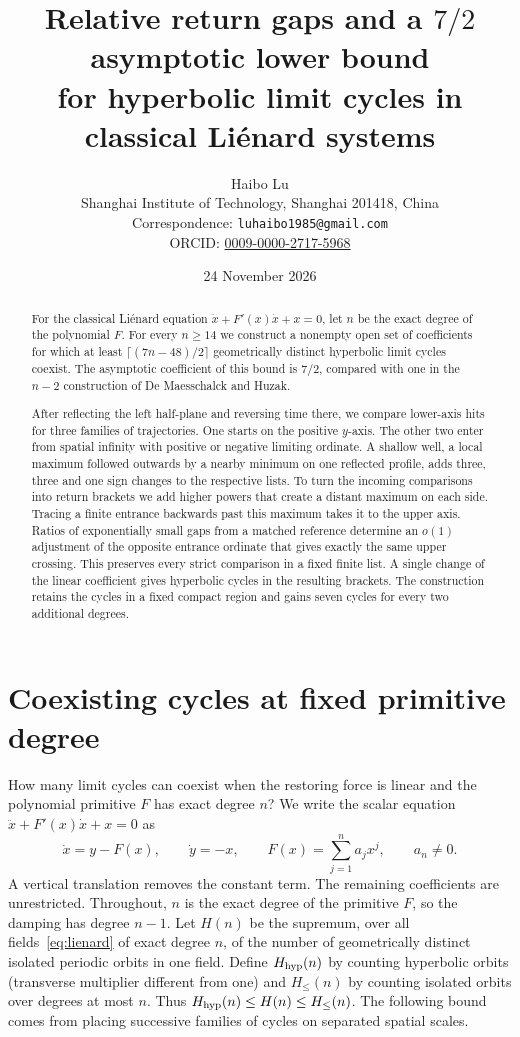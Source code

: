 \documentclass[11pt]{article}
\title{Relative return gaps and a $7/2$ asymptotic lower bound\\ for hyperbolic limit cycles in classical Li\'enard systems}
\author{Haibo Lu\\[2pt]
\small Shanghai Institute of Technology, Shanghai 201418, China\\
\small Correspondence: \nolinkurl{luhaibo1985@gmail.com}\\
\small ORCID: \href{https://orcid.org/0009-0000-2717-5968}{0009-0000-2717-5968}}
\date{24 November 2026}
\begin{document}
\maketitle
\begin{abstract}
For the classical Li\'enard equation $\ddot x+F'(x)\dot x+x=0$, let $n$
be the exact degree of the polynomial $F$. For every $n\ge14$ we
construct a nonempty open set of coefficients for which at least
$\lceil(7n-48)/2\rceil$ geometrically distinct hyperbolic limit cycles
coexist. The asymptotic coefficient of this bound is $7/2$, compared
with one in the $n-2$ construction of De Maesschalck and Huzak.

After reflecting the left half-plane and reversing time there, we compare
lower-axis hits for three families of trajectories. One starts on the
positive $y$-axis. The other two enter from spatial infinity with
positive or negative limiting ordinate. A shallow well, a local maximum
followed outwards by a nearby minimum on one reflected profile, adds
three, three and one sign changes to the respective lists. To turn
the incoming comparisons into return brackets we add higher powers that create a distant
maximum on each side. Tracing a finite entrance backwards past this
maximum takes it to the upper axis. Ratios of exponentially small gaps
from a matched reference determine an $o(1)$ adjustment of the opposite
entrance ordinate that gives exactly the same upper crossing. This
preserves every strict comparison in a fixed finite list. A single
change of the linear coefficient gives hyperbolic cycles in the
resulting brackets. The construction retains the cycles in a fixed
compact region and gains seven cycles for every two additional degrees.
\end{abstract}

\section{Coexisting cycles at fixed primitive degree}\label{sec:intro}
How many limit cycles can coexist when the restoring force is linear and the polynomial primitive $F$ has exact degree $n$? We write the scalar
equation $\ddot x+F'(x)\dot x+x=0$ as
\begin{equation}\label{eq:lienard}
 \dot x=y-F(x),\qquad \dot y=-x,\qquad
 F(x)=\sum_{j=1}^n a_jx^j,\qquad a_n\ne0 .
\end{equation}
A vertical translation removes the constant term. The remaining
coefficients are unrestricted. Throughout, $n$ is the exact degree
of the primitive $F$, so the damping has degree $n-1$.
Let $H(n)$ be the supremum, over all fields~\eqref{eq:lienard} of exact
degree $n$, of the number of geometrically distinct isolated periodic
orbits in one field. Define $H_{\mathrm{hyp}}(n)$ by counting hyperbolic orbits
(transverse multiplier different from one) and $H_{\le}(n)$ by counting
isolated orbits over degrees at most $n$. Thus
$H_{\mathrm{hyp}}(n)\le H(n)\le H_{\le}(n)$. The following bound comes from
placing successive families of cycles on separated spatial scales.
\end{document}
